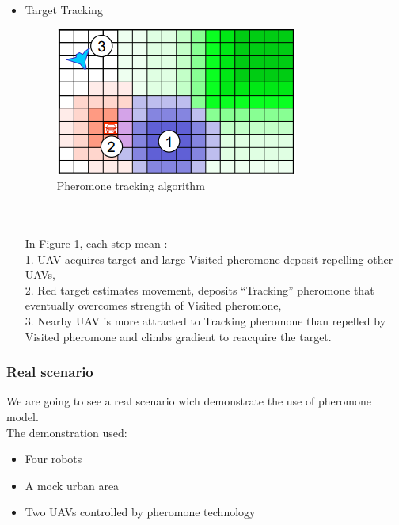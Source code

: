 \begin{itemize}
In Figure \ref{targetacquisition}, each step mean :\\
1. UAVdet detects target and Red target is created,\\
2. Red target deposits “NeedsID” pheromone, \\
3. UAVid is more attracted to NeedsID pheromone than lawn pheromone and 
climbs gradient to ID target. 
\item Target Tracking
\begin{figure}[h]
\center
\includegraphics[scale=0.7]{../images/pheromone_tracking.png}
\caption{\label{tracking} Pheromone tracking algorithm}
\end{figure}\\\\
In Figure \ref{tracking}, each step mean :\\
1. UAV acquires target and large Visited pheromone deposit repelling 
other UAVs,\\
2. Red target estimates movement, deposits “Tracking” pheromone that eventually overcomes strength of Visited pheromone, \\
3. Nearby UAV is more attracted to Tracking pheromone than repelled by Visited pheromone and climbs gradient to reacquire the target. 
\end{itemize}
\subsubsection{Real scenario}

We are going to see a real scenario wich demonstrate the use of pheromone model.\\
The demonstration used: 
\begin{itemize}
\item Four robots 
\item A mock urban area  
\item Two UAVs controlled by pheromone technology 
\end{itemize}

